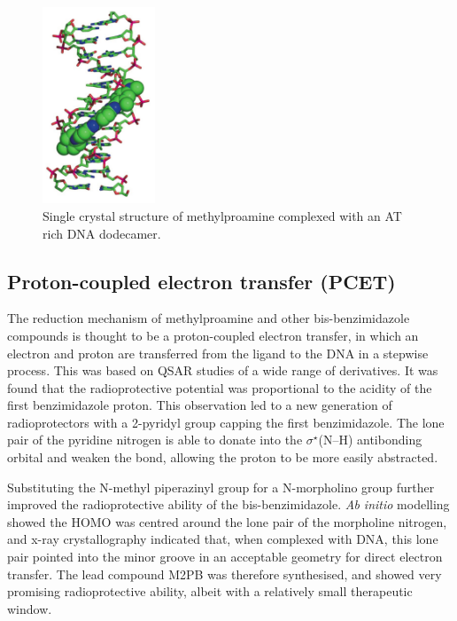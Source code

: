 \begin{refsection}
\begin{figure}
\includegraphics[width=0.3\textwidth]{Figures/mpa-dna-crystal.png}
\caption{Single crystal structure of methylproamine complexed with an AT rich DNA dodecamer.}
\label{fig:mpa-dna-crystal}
\end{figure}

\subsection{Proton-coupled electron transfer (PCET)}
The reduction mechanism of methylproamine and other bis-benzimidazole compounds is thought to be a proton-coupled electron transfer, in which an electron and proton are transferred from the ligand to the DNA in a stepwise process.
This was based on QSAR studies of a wide range of derivatives\autocite{Kakkar2005}.
It was found that the radioprotective potential was proportional to the acidity of the first benzimidazole proton.
This observation led to a new generation of radioprotectors with a 2-pyridyl group capping the first benzimidazole.
The lone pair of the pyridine nitrogen is able to donate into the $\sigma^{\star}$(N--H) antibonding orbital and weaken the bond, allowing the proton to be more easily abstracted.

Substituting the N-methyl piperazinyl group for a N-morpholino group further improved the radioprotective ability of the bis-benzimidazole.
\emph{Ab initio} modelling showed the HOMO was centred around the lone pair of the morpholine nitrogen, and x-ray crystallography indicated that, when complexed with DNA, this lone pair pointed into the minor groove in an acceptable geometry for direct electron transfer.
The lead compound M2PB  was therefore synthesised, and showed very promising radioprotective ability, albeit with a relatively small therapeutic window.


\end{refsection}

